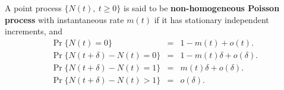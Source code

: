\documentclass[a4paper,english,12pt]{article}
\begin{document}
\begin{defn}\label{defn:NonHomogeneousPoisson} A point process $\{N(t),~t\geqslant 0\}$ is said to be \textbf{non-homogeneous Poisson process} with instantaneous rate $m(t)$ if it has stationary independent increments, and 
	\begin{eqnarray*}\label{eq:NonHomogeneousPoisson}
		\Pr\{N(t)=0\}&=&1-m(t)+o(t). \\
		\Pr\{N(t+\delta)-N(t)=0\} &=& 1-m(t)\delta+o(\delta). \\
		\Pr\{N(t+\delta)-N(t)=1\} &=& m(t)\delta+o(\delta). \\
		\Pr\{N(t+\delta)-N(t)>1\} &=& o(\delta). \\
	\end{eqnarray*}
\end{defn}
\end{document}
